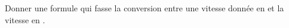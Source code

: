 
\begin{exercice}\label{exosmath-0497}

    Donner une formule qui fasse la conversion entre une vitesse donnée en \kilo\meter\per\hour et la vitesse en \meter\per\second.

\end{exercice}
